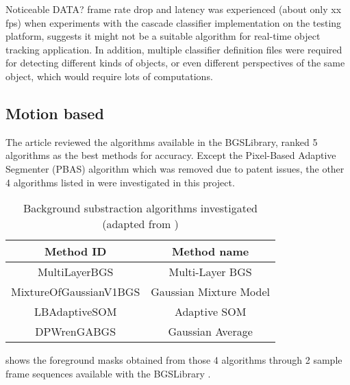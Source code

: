 Noticeable {\color{red}DATA?} frame rate drop and latency was experienced (about only {\color{red}xx} fps) when experiments with the cascade classifier implementation on the testing platform, suggests it might not be a suitable algorithm for real-time object tracking application. In addition, multiple classifier definition files were required for detecting different kinds of objects, or even different perspectives of the same object, which would require lots of computations.

\subsection{Motion based}

The article \cite{bgs:article} reviewed the algorithms available in the BGSLibrary, ranked 5 algorithms as the best methods for accuracy. Except the Pixel-Based Adaptive Segmenter (PBAS) algorithm which was removed due to patent issues, the other 4 algorithms listed in  were investigated in this project.

\begin{table}[H]
  \centering
  \begin{tabular}{cc}
  \toprule
  \textbf{Method ID} & \textbf{Method name}\\
  \midrule
  MultiLayerBGS & Multi-Layer BGS \\
  MixtureOfGaussianV1BGS & Gaussian Mixture Model \\
  LBAdaptiveSOM & Adaptive SOM \\
  DPWrenGABGS & Gaussian Average \\
  \bottomrule
  \end{tabular}
  \caption{Background substraction algorithms investigated (adapted from \cite{bgslibrary})}
  \label{Table:bgs}
\end{table}

 shows the foreground masks obtained from those 4 algorithms through 2 sample frame sequences available with the BGSLibrary \cite{bgslibrary}.

